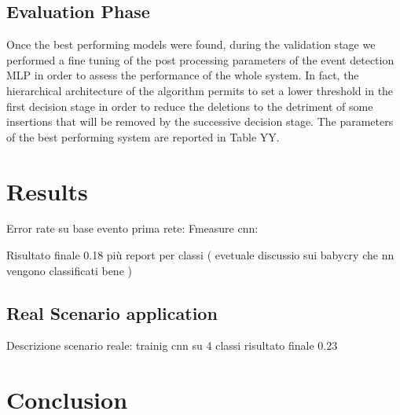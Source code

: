 \documentclass{article}
\begin{document}
\begin{sloppy}
\subsection{Evaluation Phase}
Once the best performing models were found, during the validation stage we performed a fine tuning of the post processing parameters of the event detection MLP in order to assess the performance of the whole system. In fact, the hierarchical architecture of the algorithm permits to set a lower threshold in the first decision stage in order to reduce the deletions to the detriment of some insertions that will be removed by the successive decision stage. The parameters of the best performing system are reported in Table YY.
\section{Results}
Error rate su base evento prima rete: 
Fmeasure cnn:

Risultato finale 0.18 più report per classi ( evetuale discussio sui babycry che nn vengono classificati bene )
\label{sec:typestyle}

\subsection{Real Scenario application}
Descrizione scenario reale: trainig cnn su 4 classi
risultato finale 0.23

\section{Conclusion}
\label{sec:majhead}

%


%




\end{sloppy}
\end{document}
